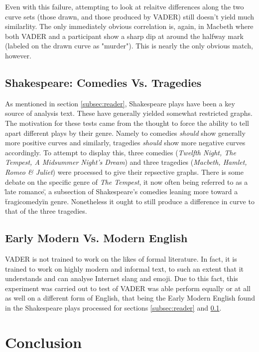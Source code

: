 \documentclass{article}
\begin{document}
            Even with this failure, attempting to look at relaitve differences along the two curve sets (those drawn, and those produced by VADER) still doesn't yield much similarlity. The only immediately obvious correlation is, again, in Macbeth where both VADER and a participant show a sharp dip at around the halfway mark (labeled on the drawn curve as "murder"). This is nearly the only obvious match, however.
    \subsection{Shakespeare: Comedies Vs. Tragedies}
    \label{subsec:comVsTrag}
        As mentioned in section \ref{subsec:reader}, Shakespeare plays have been a key source of analysis text. These have generally yielded somewhat restricted graphs. The motivation for these tests came from the thought to force the ability to tell apart different plays by their genre. Namely to comedies \emph{should} show generally more positive curves and similarly, tragedies \emph{should} show more negative curves accordingly. To attempt to display this, three comedies (\emph{Twelfth Night, The Tempest, A Midsummer Night's Dream}) and three tragedies (\emph{Macbeth, Hamlet, Romeo \& Juliet}) were processed to give their repsective graphs. There is some debate on the specific genre of \emph{The Tempest}, it now often being referred to as a \"late romance\", a subsection of Shakespeare's comedies leaning more toward a \"tragicomedy\" in genre. Nonetheless it ought to still produce a difference in curve to that of the three tragedies.
    \subsection{Early Modern Vs. Modern English}
        VADER is not trained to work on the likes of formal literature. In fact, it is trained to work on highly modern and informal text, to such an extent that it understands and can analyse Internet slang and emoji. Due to this fact, this experiment was carried out to test of VADER was able perform equally or at all as well on a different form of English, that being the Early Modern English found in the Shakespeare plays processed for sections \ref{subsec:reader} and \ref{subsec:comVsTrag}.
\newpage
\section{Conclusion}
\newpage


\end{document}
